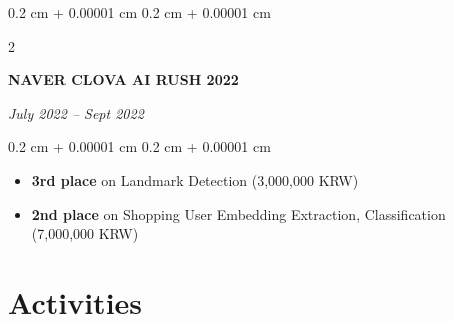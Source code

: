 \documentclass[10pt, letterpaper]{article}
\newenvironment{highlights}{
    \begin{itemize}[
        topsep=0.10 cm,
        parsep=0.10 cm,
        partopsep=0pt,
        itemsep=0pt,
        leftmargin=0.4 cm + 10pt
    ]
}{
    \end{itemize}
} %
\newenvironment{onecolentry}{
    \begin{adjustwidth}{
        0.2 cm + 0.00001 cm
    }{
        0.2 cm + 0.00001 cm
    }
}{
    \end{adjustwidth}
} %
\newenvironment{twocolentry}[2][]{
    \onecolentry
    \def\secondColumn{#2}
    \setcolumnwidth{\fill, 4.5 cm}
    \begin{paracol}{2}
}{
    \switchcolumn \raggedleft \secondColumn
    \end{paracol}
    \endonecolentry
} %
\let\hrefWithoutArrow\href
\renewcommand{\href}[2]{\hrefWithoutArrow{#1}{\ifthenelse{\equal{#2}{}}{ }{#2 }\raisebox{.15ex}{\footnotesize \faExternalLink*}}}
\begin{document}
\begin{twocolentry}{
        \textit{July 2022 – Sept 2022}
    }
    \textbf{NAVER CLOVA AI RUSH 2022 \href{https://campaign.naver.com/clova_airush/}{[link]}}
\end{twocolentry}

\vspace{0.10 cm}
\begin{onecolentry}
    \begin{highlights}
        \item \textbf{3rd place} on Landmark Detection (3,000,000 KRW)
        \item \textbf{2nd place} on Shopping User Embedding Extraction, Classification (7,000,000 KRW)
    \end{highlights}
\end{onecolentry}

\section{Activities}
\end{document}

